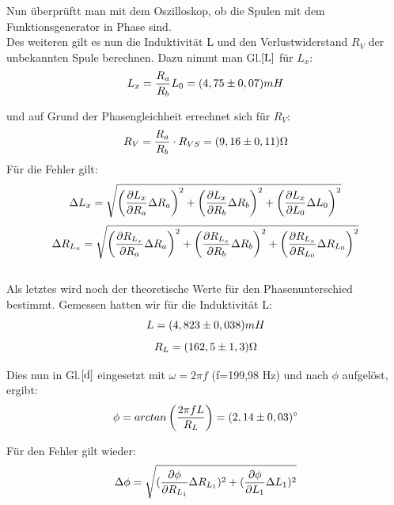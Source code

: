 Nun überprüftt man mit dem Oszilloskop, ob die Spulen mit dem Funktionsgenerator in Phase sind.\\
\newpage
Des weiteren gilt es nun die Induktivität L und den Verlustwiderstand \(R_{V}\) der unbekannten Spule berechnen. Dazu nimmt man Gl.\(\eqref{L}\) für \(L_{x}\):
\begin{equation}\notag
L_x = {\frac{R_a}{R_b}} L_0=(4,75\pm 0,07)mH
\end{equation}

und auf Grund der Phasengleichheit errechnet sich für \(R_{V}\):
\begin{equation}\notag
R_{V}=\frac{R_{a}}{R_{b}}\cdot R_{VS}=(9,16\pm 0,11)\Omega
\end{equation}
Für die Fehler gilt:
\begin{equation}\notag
\Delta L_x = {\sqrt{\left({\frac{\partial L_x}{\partial R_a}}\Delta R_a\right)^2+\left({\frac{\partial L_x}{\partial R_b}}\Delta R_b\right)^2+\left({\frac{\partial L_x}{\partial L_0}}\Delta L_0\right)^2}}
\end{equation}
\begin{equation}\notag
\Delta R_{L_x} = {\sqrt{\left({\frac{\partial R_{L_x}}{\partial R_a}}\Delta R_a\right)^2+\left({\frac{\partial R_{L_x}}{\partial R_b}}\Delta R_b\right)^2+\left({\frac{\partial R_{L_x}}{\partial R_{L_0}}}\Delta R_{L_0}\right)^2}}
\end{equation}
\\

Als letztes wird noch der theoretische Werte für den Phasenunterschied bestimmt. Gemessen hatten wir für die Induktivität L:
\begin{equation}\notag
L=(4,823 \pm 0,038)mH
\end{equation}
\begin{equation}
\notag
R_{L}=(162,5 \pm 1,3)\Omega
\end{equation}

Dies nun in Gl.\(\eqref{d}\) eingesetzt mit \(\omega=2\pi f\) (f=199,98 Hz) und nach \(\phi\) aufgelöst, ergibt:
\begin{equation}
\notag
\phi=arctan \left(\frac{2\pi f L}{R_{L}}\right)=(2,14 \pm 0,03)^\circ
\end{equation}

Für den Fehler gilt wieder:
\begin{equation}\notag
\Delta \phi = {\sqrt{({\frac{\partial \phi}{\partial R_{L_1}}}\Delta R_{L_1})^2+({\frac{\partial \phi}{\partial L_1}}\Delta L_1)^2}}
\end{equation}

